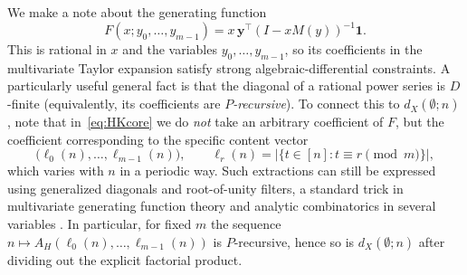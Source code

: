 \documentclass[12pt]{amsart}
\theoremstyle{definition}
\theoremstyle{remark}
\newcommand{\abs}[1]{\left|#1\right|}
\begin{document}
We make a note about the generating function 
\[
F(x;y_0,\ldots,y_{m-1})=x\,\mathbf{y}^\top(I-xM(y))^{-1}\mathbf{1}.
\]
This is rational in $x$ and the variables $y_0,\dots,y_{m-1}$, so its coefficients in the multivariate Taylor expansion
satisfy strong algebraic-differential constraints.  A particularly useful general fact is that the diagonal of a
rational power series is $D$-finite (equivalently, its coefficients are \emph{$P$-recursive}).  To connect this to $d_X(\emptyset;n)$, note that in~\eqref{eq:HKcore} we do \emph{not} take an arbitrary coefficient
of $F$, but the coefficient corresponding to the specific content vector
\[
\bigl(\ell_0(n),\dots,\ell_{m-1}(n)\bigr),
\qquad
\ell_r(n)=\abs{\{t\in[n]:t\equiv r\pmod m\}},
\]
which varies with $n$ in a periodic way.
Such extractions can still be expressed using generalized diagonals and root-of-unity filters,
a standard trick in multivariate generating function theory and analytic combinatorics in several variables
\cite{flajolet-sedgewick,pemantle-wilson}.  In particular, for fixed $m$ the sequence
$n\mapsto A_H(\ell_0(n),\dots,\ell_{m-1}(n))$ is $P$-recursive, hence so is $d_X(\emptyset;n)$ after dividing out the
explicit factorial product.
\end{document}
